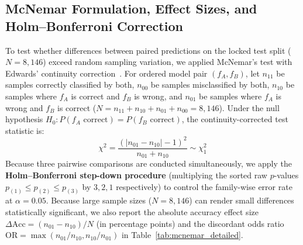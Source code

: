 \documentclass[journal]{IEEEtran}
\begin{document}
\subsection{McNemar Formulation, Effect Sizes, and Holm--Bonferroni Correction}
To test whether differences between paired predictions on the locked test split ($N = 8,146$) exceed random sampling variation, we applied McNemar's test with Edwards' continuity correction~\cite{mcnemar1947, dietterich1998}. For ordered model pair $(f_A, f_B)$, let $n_{11}$ be samples correctly classified by both, $n_{00}$ be samples misclassified by both, $n_{10}$ be samples where $f_A$ is correct and $f_B$ is wrong, and $n_{01}$ be samples where $f_A$ is wrong and $f_B$ is correct ($N = n_{11} + n_{10} + n_{01} + n_{00} = 8,146$). Under the null hypothesis $H_0: P(f_A \text{ correct}) = P(f_B \text{ correct})$, the continuity-corrected test statistic is:
\begin{equation}
\chi^2 = \frac{\left(|n_{01} - n_{10}| - 1\right)^2}{n_{01} + n_{10}} \sim \chi^2_{1}
\end{equation}
Because three pairwise comparisons are conducted simultaneously, we apply the \textbf{Holm--Bonferroni step-down procedure} (multiplying the sorted raw $p$-values $p_{(1)} \le p_{(2)} \le p_{(3)}$ by $3, 2, 1$ respectively) to control the family-wise error rate at $\alpha = 0.05$. Because large sample sizes ($N=8,146$) can render small differences statistically significant, we also report the absolute accuracy effect size $\Delta \text{Acc} = (n_{01} - n_{10})/N$ (in percentage points) and the discordant odds ratio $\text{OR} = \max(n_{01}/n_{10}, n_{10}/n_{01})$ in Table~\ref{tab:mcnemar_detailed}.
\end{document}
